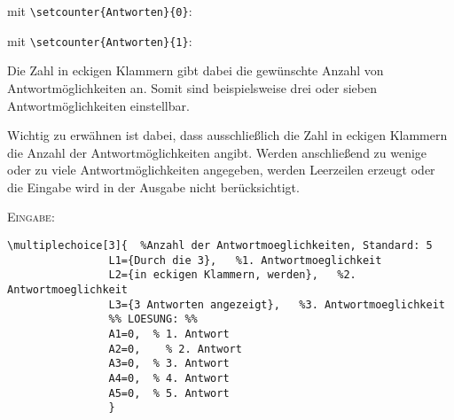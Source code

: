 \documentclass[a4paper,12pt]{article}
\begin{document}
\begin{minipage}{8cm}
\setcounter{Antworten}{0}
mit \texttt{\textbackslash setcounter\{Antworten\}\{0\}}:
\begin{center}
\end{center}
\end{minipage} \hfill 
\begin{minipage}{8cm}
mit \texttt{\textbackslash setcounter\{Antworten\}\{1\}}:
\setcounter{Antworten}{1}
\begin{center}
\end{center}
\end{minipage}

\leer

Die Zahl in eckigen Klammern gibt dabei die gewünschte Anzahl von Antwortmöglichkeiten an. Somit sind beispielsweise drei oder sieben Antwortmöglichkeiten einstellbar. \leer

Wichtig zu erwähnen ist dabei, dass ausschließlich die Zahl in eckigen Klammern die Anzahl der Antwortmöglichkeiten angibt. Werden anschließend zu wenige oder zu viele Antwortmöglichkeiten angegeben, werden Leerzeilen erzeugt oder die Eingabe wird in der Ausgabe nicht berücksichtigt. 

\leer

\textsc{Eingabe:} \setcounter{Antworten}{0}
\begin{verbatim}
\multiplechoice[3]{  %Anzahl der Antwortmoeglichkeiten, Standard: 5
				L1={Durch die 3},   %1. Antwortmoeglichkeit 
				L2={in eckigen Klammern, werden},   %2. Antwortmoeglichkeit
				L3={3 Antworten angezeigt},   %3. Antwortmoeglichkeit
				%% LOESUNG: %%
				A1=0,  % 1. Antwort
				A2=0,	 % 2. Antwort
				A3=0,  % 3. Antwort
				A4=0,  % 4. Antwort
				A5=0,  % 5. Antwort
				}
\end{verbatim}
\leer
\end{document}
